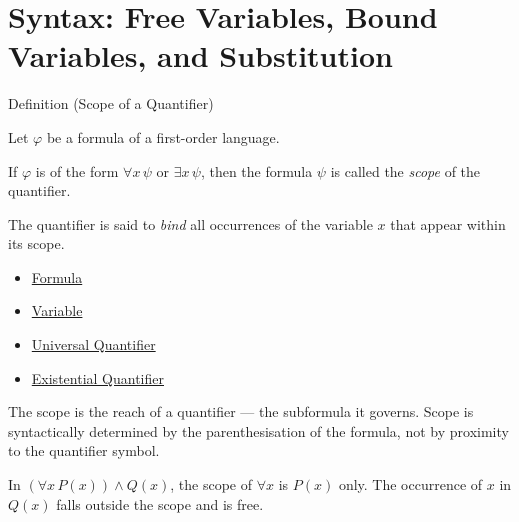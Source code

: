 
\section{Syntax: Free Variables, Bound Variables, and Substitution}


\begin{definitionbox}{Definition (Scope of a Quantifier)}
\begin{definition}\label{def:scope}
Let $\varphi$ be a formula of a first-order language.

If $\varphi$ is of the form $\forall x\,\psi$ or $\exists x\,\psi$, then the
formula $\psi$ is called the \emph{scope} of the quantifier.

The quantifier is said to \emph{bind} all occurrences of the variable $x$ that
appear within its scope.
\end{definition}
\end{definitionbox}

\begin{dependencies}
\begin{itemize}
  \item \hyperref[def:formula]{Formula}
  \item \hyperref[def:variable]{Variable}
  \item \hyperref[def:universal-q]{Universal Quantifier}
  \item \hyperref[def:existential-q]{Existential Quantifier}
\end{itemize}
\end{dependencies}

\begin{remark*}
The scope is the reach of a quantifier — the subformula it governs. Scope is
syntactically determined by the parenthesisation of the formula, not by
proximity to the quantifier symbol.
\end{remark*}

\begin{example*}
In $(\forall x\,P(x)) \wedge Q(x)$, the scope of $\forall x$ is $P(x)$ only.
The occurrence of $x$ in $Q(x)$ falls outside the scope and is free.
\end{example*}


